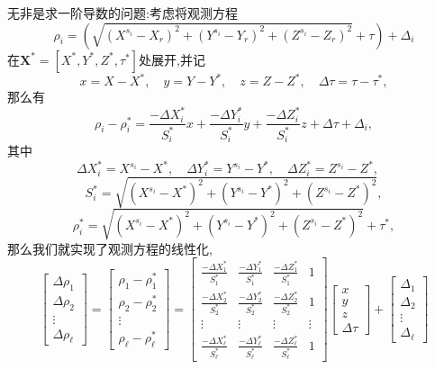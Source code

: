 \documentclass[cn,10pt,citestyle=gb7714-2015,bibstyle=gb7714-2015]{elegantbook}
\renewcommand{\l}{\ell}
\begin{document}
\begin{solution}
  无非是求一阶导数的问题:考虑将观测方程
  \begin{equation}
    \rho_i=\left(\sqrt{(X^{s_i}-X_r)^2+(Y^{s_i}-Y_r)^2+(Z^{s_i}-Z_r)^2}+\tau\right)+\varDelta_i
  \end{equation}
  在$\bm{X}^*=[X^*,Y^*,Z^*,\tau^*]$处展开,并记
  \[
      x=X-X^*,\quad y=Y-Y^*,\quad z=Z-Z^*,\quad \Delta\tau=\tau-\tau^*,
  \]
  那么有
  \begin{equation}
    \rho_i-\rho_i^*=\frac{-\Delta X_i^*}{S_i^*}x+\frac{-\Delta Y_i^*}{S_i^*}y+\frac{-\Delta Z_i^*}{S_i^*}z+\Delta\tau+\varDelta_i,
  \end{equation}
  其中
  \[
      \Delta X_i^*=X^{s_i}-X^*,\quad\Delta Y_i^*=Y^{s_i}-Y^*,\quad\Delta Z_i^*=Z^{s_i}-Z^*,\quad
  \]
  \[
      S_i^*=\sqrt{(X^{s_i}-X^*)^2+(Y^{s_i}-Y^*)^2+(Z^{s_i}-Z^*)^2},
  \]
  \[
      \rho_i^*=\sqrt{(X^{s_i}-X^*)^2+(Y^{s_i}-Y^*)^2+(Z^{s_i}-Z^*)^2}+\tau^*,
  \]
  那么我们就实现了观测方程的线性化,
  \begin{equation}
    \begin{bmatrix}
      \Delta\rho_1\\
      \Delta\rho_2\\
      \vdots\\
      \Delta\rho_\l
    \end{bmatrix}=
    \begin{bmatrix}
      \rho_1-\rho_1^*\\
      \rho_2-\rho_2^*\\
      \vdots\\
      \rho_\l-\rho_\l^*
    \end{bmatrix}=
    \begin{bmatrix}
      \frac{-\Delta X_1^*}{S_1^*}&\frac{-\Delta Y_1^*}{S_1^*}&\frac{-\Delta Z_1^*}{S_1^*}&1\\
      \frac{-\Delta X_2^*}{S_2^*}&\frac{-\Delta Y_2^*}{S_2^*}&\frac{-\Delta Z_2^*}{S_2^*}&1\\
      \vdots&\vdots&\vdots&\vdots\\
      \frac{-\Delta X_\l^*}{S_\l^*}&\frac{-\Delta Y_\l^*}{S_\l^*}&\frac{-\Delta Z_\l^*}{S_\l^*}&1
    \end{bmatrix}
    \begin{bmatrix}
      x\\
      y\\
      z\\
      \Delta\tau
    \end{bmatrix}+
    \begin{bmatrix}
      \varDelta_1\\
      \varDelta_2\\
      \vdots\\
      \varDelta_\l
    \end{bmatrix}
  \end{equation}
\end{solution}
\end{document}
